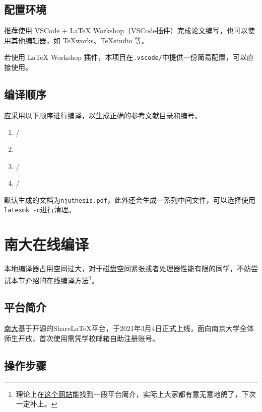 \subsection{配置环境}

推荐使用 VSCode + LaTeX Workshop（VSCode插件）完成论文编写，也可以使用其他编辑器，如 TeXworks、TeXstudio 等。

若使用 LaTeX Workshop 插件，本项目在\lstinline|.vscode/|中提供一份简易配置，可以直接使用。

\subsection{编译顺序}
应采用以下顺序进行编译，以生成正确的参考文献目录和编号。
\begin{enumerate}
    \item {}/
    \item {}
    \item {}/
    \item {}/
\end{enumerate}

默认生成的文档为\lstinline|njuthesis.pdf|，此外还会生成一系列中间文件，可以选择使用\lstinline|latexmk -c|进行清理。

\section{南大在线编译}

本地编译器占用空间过大，对于磁盘空间紧张或者处理器性能有限的同学，不妨尝试本节介绍的在线编译方法\footnote{理论上在\href{https://doc.nju.edu.cn/books/latex}{这个网站}能找到一段平台简介，实际上大家都有意无意地鸽了，下次一定补上。}。

\subsection{平台简介}

\href{https://tex.nju.edu.cn}{南大}基于开源的ShareLaTeX平台，于2021年3月4日正式上线，面向南京大学全体师生开放，首次使用需凭学校邮箱自助注册账号。

\subsection{操作步骤}

